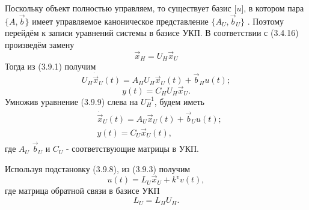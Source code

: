 Поскольку объект полностью управляем, то существует базис [$u$], в котором пара $\{A,\vec{b}\}$ имеет управляемое каноническое представление $\{A_U,\vec{b}_U\}$ . Поэтому перейдём к записи уравнений системы в базисе УКП. В соответствии с (3.4.16) произведём замену 
\begin{equation}
	\vec{x}_H=U_H\vec{x}_U
\end{equation}
Тогда из (3.9.1) получим
\begin{equation}
	U_H\dot{\vec{x}}_U(t)=A_HU_H\vec{x}_U(t)+\vec{b}_Hu(t);
\end{equation}
\begin{equation}
	y(t)=C_HU_H\vec{x}_U.
\end{equation}
Умножив уравнение (3.9.9) слева на $U_H^{-1}$, будем иметь
\begin{gather}
\begin{split}
	&\dot{\vec{x}}_U(t)=A_U\vec{x}_U(t)+\vec{b}_Uu(t);\\
	&y(t) = C_U\vec{x}_U(t),
\end{split}
\end{gather}
где $A_U$ $\vec{b}_U$ и $C_U$ - соответствующие матрицы в УКП.

Используя подстановку (3.9.8), из (3.9.3) получим
\begin{equation}
	u(t)=L_U\vec{x}_U+k^vv(t),
\end{equation}
где матрица обратной связи в базисе УКП
\begin{equation}
	L_U=L_HU_H.
\end{equation}

